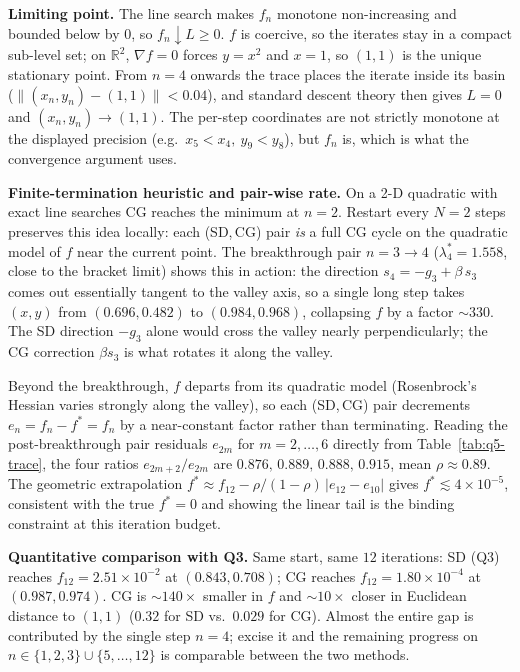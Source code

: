 \documentclass[11pt,a4paper]{article}
\begin{document}
\textbf{Limiting point.}
The line search makes \(f_n\) monotone non-increasing and bounded below by \(0\), so \(f_n\downarrow L\ge 0\). \(f\) is coercive, so the iterates stay in a compact sub-level set; on \(\mathbb{R}^{2}\), \(\nabla f=0\) forces \(y=x^{2}\) and \(x=1\), so \((1,1)\) is the unique stationary point. From \(n=4\) onwards the trace places the iterate inside its basin (\(\|(x_n,y_n)-(1,1)\|<0.04\)), and standard descent theory then gives \(L=0\) and \((x_n,y_n)\to(1,1)\). The per-step coordinates are not strictly monotone at the displayed precision (e.g.\ \(x_5<x_4,\ y_9<y_8\)), but \(f_n\) is, which is what the convergence argument uses.

\textbf{Finite-termination heuristic and pair-wise rate.}
On a 2-D quadratic with exact line searches CG reaches the minimum at \(n=2\). Restart every \(N=2\) steps preserves this idea locally: each (SD,\,CG) pair \emph{is} a full CG cycle on the quadratic model of \(f\) near the current point. The breakthrough pair \(n=3\to 4\) (\(\lambda^{*}_{4}=1.558\), close to the bracket limit) shows this in action: the direction \(s_{4}=-g_{3}+\beta\,s_{3}\) comes out essentially tangent to the valley axis, so a single long step takes \((x,y)\) from \((0.696,0.482)\) to \((0.984,0.968)\), collapsing \(f\) by a factor \(\sim 330\). The SD direction \(-g_{3}\) alone would cross the valley nearly perpendicularly; the CG correction \(\beta s_{3}\) is what rotates it along the valley.

Beyond the breakthrough, \(f\) departs from its quadratic model (Rosenbrock's Hessian varies strongly along the valley), so each (SD,\,CG) pair decrements \(e_n=f_n-f^{*}=f_n\) by a near-constant factor rather than terminating. Reading the post-breakthrough pair residuals \(e_{2m}\) for \(m=2,\dots,6\) directly from Table~\ref{tab:q5-trace}, the four ratios \(e_{2m+2}/e_{2m}\) are \(0.876,\,0.889,\,0.888,\,0.915\), mean \(\rho\approx 0.89\). The geometric extrapolation \(f^{*}\approx f_{12}-\rho/(1-\rho)\,|e_{12}-e_{10}|\) gives \(f^{*}\lesssim 4\!\times\!10^{-5}\), consistent with the true \(f^{*}=0\) and showing the linear tail is the binding constraint at this iteration budget.

\textbf{Quantitative comparison with Q3.}
Same start, same \(12\) iterations: SD (Q3) reaches \(f_{12}=2.51\!\times\!10^{-2}\) at \((0.843,0.708)\); CG reaches \(f_{12}=1.80\!\times\!10^{-4}\) at \((0.987,0.974)\). CG is \(\sim 140\!\times\) smaller in \(f\) and \(\sim 10\!\times\) closer in Euclidean distance to \((1,1)\) (\(0.32\) for SD vs.\ \(0.029\) for CG). Almost the entire gap is contributed by the single step \(n=4\); excise it and the remaining progress on \(n\in\{1,2,3\}\cup\{5,\ldots,12\}\) is comparable between the two methods.
\end{document}
